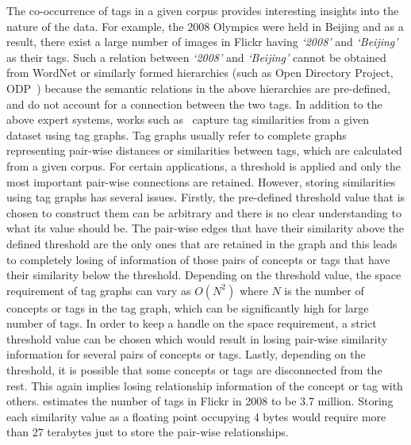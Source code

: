 The co-occurrence of tags in a given corpus provides interesting insights into the nature of the data. For example, the 2008 Olympics were held in Beijing and as a result, there exist a large number of images in Flickr having \emph{`2008'} and \emph{`Beijing'} as their tags. Such a relation between \emph{`2008'} and \emph{`Beijing'} cannot be obtained from WordNet or similarly formed hierarchies (such as Open Directory Project, ODP~\cite{website:ODP}) because the semantic relations in the above hierarchies are pre-defined, and do not account for a connection between the two tags. In addition to the above expert systems, works such as~\cite{sigurbjornsson2008flickr} capture tag similarities from a given dataset using tag graphs. Tag graphs usually refer to complete graphs representing pair-wise distances or similarities between tags, which are calculated from a given corpus.  For certain applications, a threshold is applied and only the most important pair-wise connections are retained. However, storing similarities using tag graphs has several issues. Firstly, the pre-defined threshold value that is chosen to construct them can be arbitrary and there is no clear understanding to what its value should be. The pair-wise edges that have their similarity above the defined threshold are the only ones that are retained in the graph and this leads to completely losing of information of those pairs of concepts or tags that have their similarity below the threshold. Depending on the threshold value, the space requirement of tag graphs can vary as $O(N^2)$ where $N$ is the number of concepts or tags in the tag graph, which can be significantly high for large number of tags. In order to keep a handle on the space requirement, a strict threshold value can be chosen which would result in losing pair-wise similarity information for several pairs of concepts or tags. Lastly, depending on the threshold, it is possible that some concepts or tags are disconnected from the rest. This again implies losing relationship information of the concept or tag with others. \cite{sigurbjornsson2008flickr} estimates the number of tags in Flickr in 2008 to be 3.7 million. Storing each similarity value as a floating point occupying 4 bytes would require more than 27 terabytes just to store the pair-wise relationships. 


